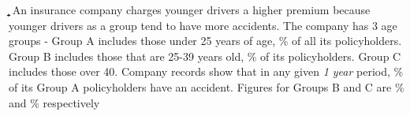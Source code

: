 


\FRACADD{}\a\b
{}\a\b\c\d

\question 
An insurance company charges younger drivers a higher premium because younger drivers 
as a group tend to have more accidents. The company has 3 age groups - Group A includes those
under 25 years of age, \vbone\% of all its policyholders. Group B includes those that are 25-39 years
old,  \vbtwo\% of its policyholders. Group C includes those over 40. Company 
records show that in any given \textit{1 year} period, \vbthree\% of its Group A policyholders have 
an accident. Figures for Groups B and C are \vbfour\% and \vbfive\% respectively

\watchout[-80pt]

\ifprintanswers
\fi 

